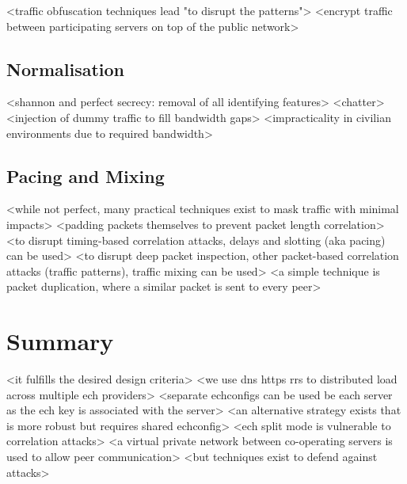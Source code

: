 <traffic obfuscation techniques lead "to disrupt the patterns">
<encrypt traffic between participating servers on top of the public network>

\subsection{Normalisation}

<shannon and perfect secrecy: removal of all identifying features>
<chatter>
<injection of dummy traffic to fill bandwidth gaps>
<impracticality in civilian environments due to required bandwidth>

\subsection{Pacing and Mixing}

<while not perfect, many practical techniques exist to mask traffic with minimal impacts>
<padding packets themselves to prevent packet length correlation>
\cite{yu2012predicted}
<to disrupt timing-based correlation attacks, delays and slotting (aka pacing) can be used>
<to disrupt deep packet inspection, other packet-based correlation attacks (traffic patterns), traffic mixing can be used>
\cite{fu2003analytical, fu2003effectiveness}
<a simple technique is packet duplication, where a similar packet is sent to every peer>






\section{Summary}

<it fulfills the desired design criteria>
<we use dns https rrs to distributed load across multiple ech providers>
<separate echconfigs can be used be each server as the ech key is associated with the server>
<an alternative strategy exists that is more robust but requires shared echconfig>
<ech split mode is vulnerable to correlation attacks>
<a virtual private network between co-operating servers is used to allow peer communication>
<but techniques exist to defend against attacks>
